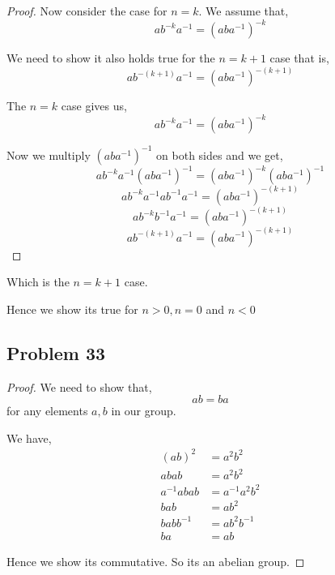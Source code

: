 \documentclass[a4paper]{report}
\begin{document}
\begin{proof}
        Now consider the case for $n = k$. We assume that, 
        $$ ab^{-k}a^{-1} = (aba^{-1})^{- k} $$ 

        We need to show it also holds true for the $n = k + 1$ case that is, 
        $$ ab^{-(k  + 1)}a^{-1} = (aba^{-1})^{-(k + 1)} $$ 


        The $n = k$ case gives us, 
        $$ ab^{-k}a^{-1} = (aba^{-1})^{- k} $$ 

        Now we multiply $(aba^{-1})^{-1}$ on both sides and we get, 
        $$ ab^{-k}a^{-1} (aba^{-1})^{-1} = (aba^{-1})^{-k} (aba^{-1})^{-1} $$ 
        $$ ab^{-k}a^{-1} ab^{-1}a^{-1} = (aba^{-1})^{-(k + 1)} $$                   
        $$ ab^{-k}b^{-1}a^{-1} = (aba^{-1})^{-(k + 1)} $$                   
        $$ ab^{-(k + 1)}a^{-1} = (aba^{-1})^{-(k + 1)} $$                   
    \end{proof}

    Which is the $n = k + 1$ case. 

    Hence we show its true for $n > 0, n = 0$ and $n < 0$




\subsection*{Problem 33}
\begin{proof}
    We need to show that, 
    $$ ab = ba $$  for any elements $a,b$ in our group.

    We have, 
    \begin{align*}
        (ab)^2 &= a^2b^2\\
        ab ab &= a^2 b^2\\
        a^{-1}abab  &= a^{-1} a^2 b^2\\
        bab &= ab^2\\
        bab b^{-1} &= ab^2 b^{-1}\\
        ba &= ab
    \end{align*}

    Hence we show its commutative. So its an abelian group.
\end{proof}
\end{document}
